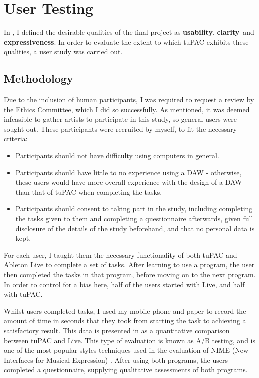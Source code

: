 \documentclass[12pt,a4paper,oneside,openright]{report}
\newcommand{\usability}{\textbf{usability}}
\newcommand{\clarity}{\textbf{clarity}}
\newcommand{\expressiveness}{\textbf{expressiveness}}
\begin{document}
\section{User Testing}
In , I defined the desirable qualities of the final project as \usability, \clarity\ and \expressiveness. In order to evaluate the extent to which tuPAC exhibits these qualities, a user study was carried out.

\subsection{Methodology}
Due to the inclusion of human participants, I was required to request a review by the Ethics Committee, which I did so successfully. As mentioned, it was deemed infeasible to gather artists to participate in this study, so general users were sought out. These participants were recruited by myself, to fit the necessary criteria:
\begin{itemize}
    \item Participants should not have difficulty using computers in general.
    \item Participants should have little to no experience using a DAW - otherwise, these users would have more overall experience with the design of a DAW than that of tuPAC when completing the tasks.
    \item Participants should consent to taking part in the study, including completing the tasks given to them and completing a questionnaire afterwards, given full disclosure of the details of the study beforehand, and that no personal data is kept.
\end{itemize}

For each user, I taught them the necessary functionality of both tuPAC and Ableton Live to complete a set of tasks. After learning to use a program, the user then completed the tasks in that program, before moving on to the next program. In order to control for a bias here, half of the users started with Live, and half with tuPAC.

Whilst users completed tasks, I used my mobile phone and paper to record the amount of time in seconds that they took from starting the task to achieving a satisfactory result. This data is presented in  as a quantitative comparison between tuPAC and Live. This type of evaluation is known as A/B testing, and is one of the most popular styles techniques used in the evaluation of NIME (New Interfaces for Musical Expression) \cite{Huot15}. After using both programs, the users completed a questionnaire, supplying qualitative assessments of both programs.
\end{document}
